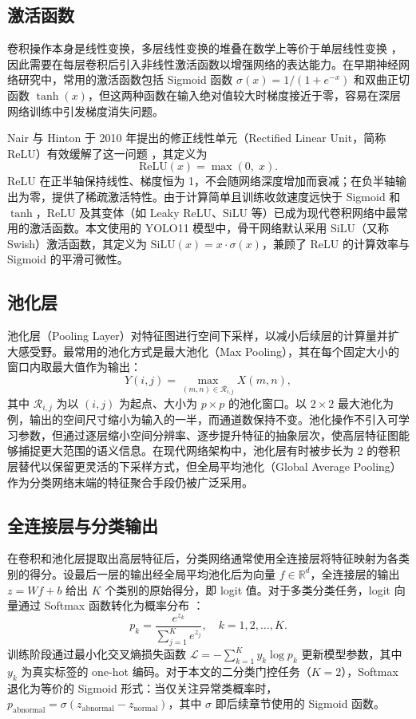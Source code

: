 \documentclass[UTF8,openany,12pt]{ctexbook}
\begin{document}
\subsection{激活函数}
卷积操作本身是线性变换，多层线性变换的堆叠在数学上等价于单层线性变换 \cite{goodfellow2016deep}，因此需要在每层卷积后引入非线性激活函数以增强网络的表达能力。在早期神经网络研究中，常用的激活函数包括 Sigmoid 函数 $\sigma(x)=1/(1+e^{-x})$ 和双曲正切函数 $\tanh(x)$，但这两种函数在输入绝对值较大时梯度接近于零，容易在深层网络训练中引发梯度消失问题。

Nair 与 Hinton 于 2010 年提出的修正线性单元（Rectified Linear Unit，简称 ReLU）有效缓解了这一问题 \cite{nair2010relu}，其定义为
\begin{equation}
\mathrm{ReLU}(x) = \max(0,\; x).
\end{equation}
ReLU 在正半轴保持线性、梯度恒为 1，不会随网络深度增加而衰减；在负半轴输出为零，提供了稀疏激活特性。由于计算简单且训练收敛速度远快于 Sigmoid 和 $\tanh$，ReLU 及其变体（如 Leaky ReLU、SiLU 等）已成为现代卷积网络中最常用的激活函数。本文使用的 YOLO11 模型中，骨干网络默认采用 SiLU（又称 Swish）激活函数，其定义为 $\mathrm{SiLU}(x) = x \cdot \sigma(x)$，兼顾了 ReLU 的计算效率与 Sigmoid 的平滑可微性。

\subsection{池化层}
池化层（Pooling Layer）对特征图进行空间下采样，以减小后续层的计算量并扩大感受野。最常用的池化方式是最大池化（Max Pooling），其在每个固定大小的窗口内取最大值作为输出：
\begin{equation}
Y(i,j) = \max_{(m,n) \in \mathcal{R}_{i,j}} X(m,n),
\end{equation}
其中 $\mathcal{R}_{i,j}$ 为以 $(i,j)$ 为起点、大小为 $p \times p$ 的池化窗口。以 $2 \times 2$ 最大池化为例，输出的空间尺寸缩小为输入的一半，而通道数保持不变。池化操作不引入可学习参数，但通过逐层缩小空间分辨率、逐步提升特征的抽象层次，使高层特征图能够捕捉更大范围的语义信息。在现代网络架构中，池化层有时被步长为 2 的卷积层替代以保留更灵活的下采样方式，但全局平均池化（Global Average Pooling）作为分类网络末端的特征聚合手段仍被广泛采用。

\subsection{全连接层与分类输出}
在卷积和池化层提取出高层特征后，分类网络通常使用全连接层将特征映射为各类别的得分。设最后一层的输出经全局平均池化后为向量 $f \in \mathbb{R}^d$，全连接层的输出 $z = Wf + b$ 给出 $K$ 个类别的原始得分，即 logit 值。对于多类分类任务，logit 向量通过 Softmax 函数转化为概率分布 \cite{goodfellow2016deep}：
\begin{equation}
p_k = \frac{e^{z_k}}{\displaystyle\sum_{j=1}^{K} e^{z_j}}, \quad k = 1, 2, \dots, K.
\end{equation}
训练阶段通过最小化交叉熵损失函数 $\mathcal{L} = -\sum_{k=1}^{K} y_k \log p_k$ 更新模型参数，其中 $y_k$ 为真实标签的 one-hot 编码。对于本文的二分类门控任务（$K=2$），Softmax 退化为等价的 Sigmoid 形式：当仅关注异常类概率时，$p_{\mathrm{abnormal}} = \sigma(z_{\mathrm{abnormal}} - z_{\mathrm{normal}})$，其中 $\sigma$ 即后续章节使用的 Sigmoid 函数。
\end{document}
